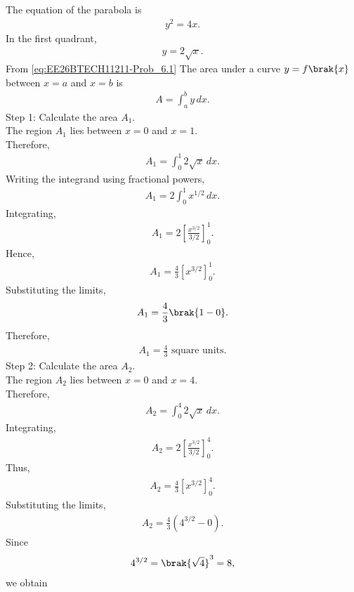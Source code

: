 \begin{enumerate}[label=\thesubsection.\arabic*, ref=\thesubsection.\theenumi]
\solution
The equation of the parabola is
\begin{align}
y^2=4x.
\end{align}
In the first quadrant,
\begin{align}
y=2\sqrt{x}.
\end{align}
 From \eqref{eq:EE26BTECH11211-Prob_6.1} The area under a curve $y=f\brak{x}$ between $x=a$ and $x=b$ is
\begin{align}
A=\int_a^b y\,dx.
\end{align}
{Step 1: Calculate the area $A_1$.}
\\The region $A_1$ lies between $x=0$ and $x=1$.
\\Therefore,
\begin{align}
A_1=\int_0^1 2\sqrt{x}\,dx.
\end{align}
Writing the integrand using fractional powers,
\begin{align}
A_1=2\int_0^1 x^{1/2}\,dx.
\end{align}
Integrating,
\begin{align}
A_1=2\left[\frac{x^{3/2}}{3/2}\right]_0^1.
\end{align}
Hence,
\begin{align}
A_1=\frac{4}{3}\left[x^{3/2}\right]_0^1.
\end{align}
Substituting the limits,
\begin{align}
A_1=\frac{4}{3}\brak{1-0}.
\end{align}
Therefore,
\begin{align}
A_1=\frac{4}{3}\text{ square units}.
\end{align}
{Step 2: Calculate the area $A_2$.}
\\The region $A_2$ lies between $x=0$ and $x=4$.
\\Therefore,
\begin{align}
A_2=\int_0^4 2\sqrt{x}\,dx.
\end{align}
Integrating,
\begin{align}
A_2=2\left[\frac{x^{3/2}}{3/2}\right]_0^4.
\end{align}
Thus,
\begin{align}
A_2=\frac{4}{3}\left[x^{3/2}\right]_0^4.
\end{align}
Substituting the limits,
\begin{align}
A_2=\frac{4}{3}\left(4^{3/2}-0\right).
\end{align}
Since
\begin{align}
4^{3/2}=\brak{\sqrt{4}}^3=8,
\end{align}
we obtain
\begin{align}

\end{align}
\end{enumerate}
